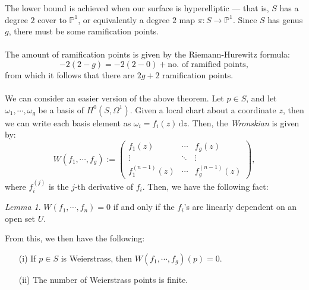 \documentclass[a4paper]{report}
\theoremstyle{definition}
\theoremstyle{remark}
\theoremstyle{proposition}
\theoremstyle{conjecture}
\theoremstyle{lemma}
\newtheorem{lemma}{Lemma}
\theoremstyle{corollary}
\theoremstyle{exercise}
\theoremstyle{example}
\newcommand{\diff}{\,\mathrm{d}}
\begin{document}
The lower bound is achieved when our surface is hyperelliptic --- that is,
$S$ has a degree $2$ cover to $\mathbb{P}^1$, or equivalently
a degree $2$ map $\pi : S \to \mathbb{P}^1$. Since $S$ has genus $g$,
there must be some ramification points.\\\\
The amount of ramification points is given by the Riemann-Hurewitz formula:
$$-2(2-g) = -2(2-0) + \text{no. of ramified points},$$
from which it follows that there are $2g+2$ ramification points.\\\\
We can consider an easier version of the above theorem. 
Let $p\in S$, and let $\omega_1,\cdots,\omega_g$ be a basis of 
$H^0(S,\Omega^1)$. Given a local chart about a coordinate $z$, then we 
can write each basis element as $\omega_i = f_i(z)\diff z$.
Then, the \emph{Wronskian} is given by:
$$W(f_1,\cdots,f_g) := \begin{pmatrix}
    f_1(z) & \cdots & f_g(z)\\
    \vdots & \ddots & \vdots \\
    f_1^{(n-1)}(z) & \cdots & f_g^{(n-1)}(z)
\end{pmatrix},$$
where $f_i^{(j)}$ is the $j$-th derivative of $f_i$.
Then, we have the following fact:
\begin{lemma}
    $W(f_1,\cdots,f_n) = 0$ if and only if the $f_i$'s are linearly 
    dependent on an open set $U$.
\end{lemma}
From this, we then have the following:
\begin{theorem}
    \leavevmode
    \begin{itemize}
        \item[(i)] If $p\in S$ is Weierstrass, then $W(f_1,\cdots,f_g)(p)=0$.
        \item[(ii)] The number of Weierstrass points is finite.
    \end{itemize}
\end{theorem}
\end{document}

